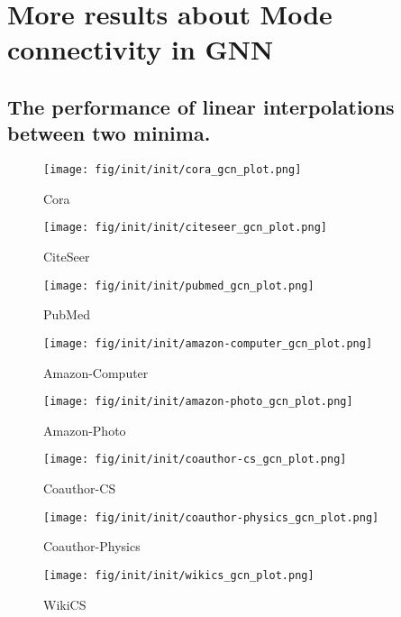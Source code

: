 \section{More results about Mode connectivity in GNN}
\label{app: A}

\subsection{The performance of linear interpolations 
between two minima.}

\begin{figure*}[!ht]
    \centering
    \begin{subfigure}[b]{0.24\textwidth}
        \texttt{[image: fig/init/init/cora\_gcn\_plot.png]}
        \caption{Cora}
    \end{subfigure}
    \begin{subfigure}[b]{0.24\textwidth}
        \texttt{[image: fig/init/init/citeseer\_gcn\_plot.png]}
        \caption{CiteSeer}
    \end{subfigure}
    \begin{subfigure}[b]{0.24\textwidth}
        \texttt{[image: fig/init/init/pubmed\_gcn\_plot.png]}
        \caption{PubMed}
    \end{subfigure}
    \begin{subfigure}[b]{0.24\textwidth}
        \texttt{[image: fig/init/init/amazon-computer\_gcn\_plot.png]}
        \caption{Amazon-Computer}
    \end{subfigure}
    \begin{subfigure}[b]{0.24\textwidth}
        \texttt{[image: fig/init/init/amazon-photo\_gcn\_plot.png]}
        \caption{Amazon-Photo}
    \end{subfigure}
    \begin{subfigure}[b]{0.24\textwidth}
        \texttt{[image: fig/init/init/coauthor-cs\_gcn\_plot.png]}
        \caption{Coauthor-CS}
    \end{subfigure}
    \begin{subfigure}[b]{0.24\textwidth}
        \texttt{[image: fig/init/init/coauthor-physics\_gcn\_plot.png]}
        \caption{Coauthor-Physics}
    \end{subfigure}
    \begin{subfigure}[b]{0.24\textwidth}
        \texttt{[image: fig/init/init/wikics\_gcn\_plot.png]}
        \caption{WikiCS}
    \end{subfigure}

\end{figure*}
